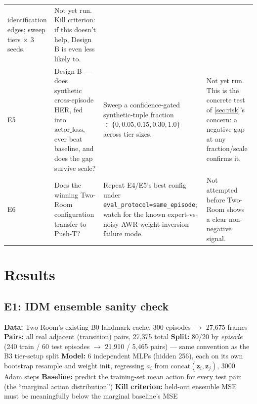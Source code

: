\documentclass[11pt]{article}
\newcommand{\zv}{\mathbf{z}}
\begin{document}
\begin{center}
\begin{longtable}{@{}p{0.6cm}p{4.6cm}p{5.4cm}p{3.6cm}@{}}
identification edges; sweep tiers $\times$ 3 seeds. & Not yet run. Kill criterion: if this
doesn't help, Design B is even less likely to. \\
\addlinespace
E5 & Design B --- does synthetic cross-episode HER, fed into $\mathrm{actor\_loss}$, ever beat
baseline, and does the gap survive scale? & Sweep a confidence-gated synthetic-tuple fraction
$\in\{0, 0.05, 0.15, 0.30, 1.0\}$ across tier sizes. & Not yet run. This is the concrete test of
\cref{sec:risk}'s concern: a negative gap at any fraction/scale confirms it. \\
\addlinespace
E6 & Does the winning Two-Room configuration transfer to Push-T? & Repeat E4/E5's best config
under \texttt{eval\_protocol=same\_episode}; watch for the known expert-vs-noisy AWR
weight-inversion failure mode. & Not attempted before Two-Room shows a clear non-negative
signal. \\
\end{longtable}
\end{center}

\section{Results}

\subsection{E1: IDM ensemble sanity check}
\label{sec:e1-results}

\begin{algorithm}[H]
\caption{E1 methodology}
\label{alg:idm}
\begin{algorithmic}[1]
\State \textbf{Data:} Two-Room's existing B0 landmark cache, 300 episodes $\to$ 27{,}675 frames
\State \textbf{Pairs:} all real adjacent (transition) pairs, 27{,}375 total
\State \textbf{Split:} 80/20 by \emph{episode} (240 train / 60 test episodes $\to$ 21{,}910 /
5{,}465 pairs) --- same convention as the B3 tier-setup split
\State \textbf{Model:} 6 independent MLPs (hidden 256), each on its own bootstrap resample and
weight init, regressing $a_i$ from $\mathrm{concat}(\zv_i,\zv_j)$, 3000 Adam steps
\State \textbf{Baseline:} predict the training-set mean action for every test pair (the
``marginal action distribution'')
\State \textbf{Kill criterion:} held-out ensemble MSE must be meaningfully below the marginal
baseline's MSE
\end{algorithmic}
\end{algorithm}
\end{document}
